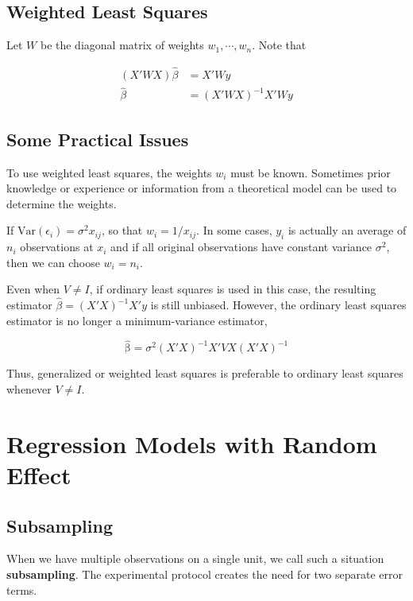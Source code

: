 \documentclass[12pt]{article}
\begin{document}
\subsection{Weighted Least Squares}


Let $W$ be the diagonal matrix of weights $w_1, \cdots, w_n$. Note that 

$$
\begin{aligned}
(X'WX)\hat{\beta} &= X'Wy\\[8pt]
\hat{\beta} &= (X'WX)^{-1}X'Wy 
\end{aligned}
$$


\subsection{Some Practical Issues}

To use weighted least squares, the weights $w_i$ must be known. Sometimes prior knowledge or experience or information from a theoretical model can be used to determine the weights.

If $\mathrm{Var}(\epsilon_i) = \sigma^2 x_{ij}$, so that $w_i = 1/x_{ij}$. In some cases, $y_i$ is actually an average of $n_i$ observations at $x_i$ and if all original observations have constant variance $\sigma^2$, then we can choose $w_i = n_i$.

Even when $V \neq I$, if ordinary least squares is used in this case, the resulting estimator $\hat{\beta}= (X′X)^{-1}X′y$ is still unbiased. However, the ordinary least squares estimator is no longer a minimum-variance estimator, 

$$
\mathrm{\hat{\beta}} = \sigma^2 (X'X)^{-1}X'VX(X'X)^{-1}
$$

Thus, generalized or weighted least squares is preferable to ordinary least squares whenever $V \neq I$.

\section{Regression Models with Random Effect}

\subsection{Subsampling}

When we have multiple observations on a single unit, we call such a situation \textbf{subsampling}. The experimental protocol creates the need for two separate error terms.
\end{document}
